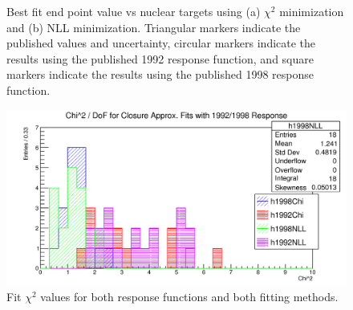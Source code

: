 \begin{figure}[h]
  \centering
  \hfill
  \caption{Best fit end point value vs nuclear targets using (a) $\chi^2$ minimization and (b) NLL minimization.
    Triangular markers indicate the published values and uncertainty, circular markers indicate the results
    using the published 1992 response function, and square markers indicate the results using the published
    1998 response function.
  }
\end{figure}
\begin{figure}[h]
  \centering
  \includegraphics[width=\linewidth]{figures/png/chiSq_of_fits.png}
  \caption{Fit $\chi^2$ values for both response functions and both fitting methods. }
  \label{fig:ChiSqOfFits}
\end{figure}



